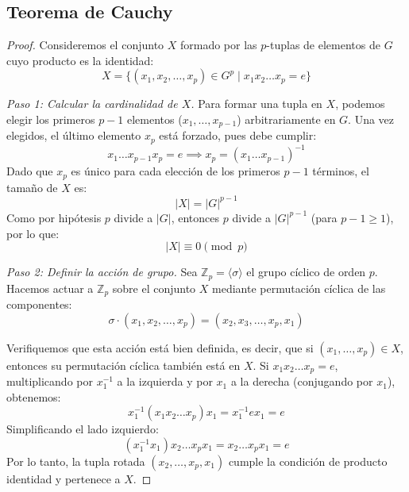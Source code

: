 \subsection{Teorema de Cauchy}


\begin{proof}
    Consideremos el conjunto $X$ formado por las $p$-tuplas de elementos de $G$ cuyo producto es la identidad:
    \begin{equation*}
        X = \{(x_1, x_2, \dots, x_p) \in G^p \mid x_1 x_2 \dots x_p = e\}
    \end{equation*}
    
    \textit{Paso 1: Calcular la cardinalidad de $X$.}
    Para formar una tupla en $X$, podemos elegir los primeros $p-1$ elementos ($x_1, \dots, x_{p-1}$) arbitrariamente en $G$. Una vez elegidos, el último elemento $x_p$ está forzado, pues debe cumplir:
    \begin{equation*}
        x_1 \dots x_{p-1} x_p = e \implies x_p = (x_1 \dots x_{p-1})^{-1}
    \end{equation*}
    Dado que $x_p$ es único para cada elección de los primeros $p-1$ términos, el tamaño de $X$ es:
    \begin{equation*}
        |X| = |G|^{p-1}
    \end{equation*}
    Como por hipótesis $p$ divide a $|G|$, entonces $p$ divide a $|G|^{p-1}$ (para $p-1 \ge 1$), por lo que:
    \begin{equation*}
        |X| \equiv 0 \pmod p
    \end{equation*}

    \textit{Paso 2: Definir la acción de grupo.}
    Sea $\mathbb{Z}_p = \langle \sigma \rangle$ el grupo cíclico de orden $p$. Hacemos actuar a $\mathbb{Z}_p$ sobre el conjunto $X$ mediante permutación cíclica de las componentes:
    \begin{equation*}
        \sigma \cdot (x_1, x_2, \dots, x_p) = (x_2, x_3, \dots, x_p, x_1)
    \end{equation*}
    
    Verifiquemos que esta acción está bien definida, es decir, que si $(x_1, \dots, x_p) \in X$, entonces su permutación cíclica también está en $X$.
    Si $x_1 x_2 \dots x_p = e$, multiplicando por $x_1^{-1}$ a la izquierda y por $x_1$ a la derecha (conjugando por $x_1$), obtenemos:
    \begin{equation*}
        x_1^{-1} (x_1 x_2 \dots x_p) x_1 = x_1^{-1} e x_1 = e
    \end{equation*}
    Simplificando el lado izquierdo:
    \begin{equation*}
        (x_1^{-1} x_1) x_2 \dots x_p x_1 = x_2 \dots x_p x_1 = e
    \end{equation*}
    Por lo tanto, la tupla rotada $(x_2, \dots, x_p, x_1)$ cumple la condición de producto identidad y pertenece a $X$.


\end{proof}
